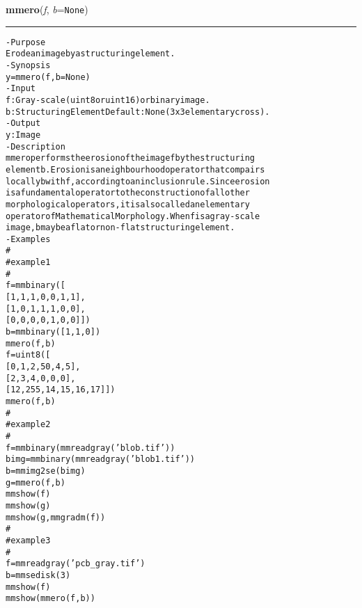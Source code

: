     \label{multireg:num_pymorph:mmero}
    \vspace{0.5ex}

    \begin{boxedminipage}{\textwidth}

    \raggedright \textbf{mmero}(\textit{f}, \textit{b}=\texttt{N\-o\-n\-e\-})

    \vspace{-1.5ex}

    \rule{\textwidth}{0.5\fboxrule}
\begin{alltt}
- Purpose
    Erode an image by a structuring element.
- Synopsis
    y = mmero(f, b=None)
- Input
    f: Gray-scale (uint8 or uint16) or binary image.
    b: Structuring Element Default: None (3x3 elementary cross).
- Output
    y: Image
- Description
    mmero performs the erosion of the image f by the structuring
    element b . Erosion is a neighbourhood operator that compairs
    locally b with f , according to an inclusion rule. Since erosion
    is a fundamental operator to the construction of all other
    morphological operators, it is also called an elementary
    operator of Mathematical Morphology. When f is a gray-scale
    image , b may be a flat or non-flat structuring element.
- Examples
    \#
    \#   example 1
    \#
    f=mmbinary([
       [1, 1, 1, 0, 0, 1, 1],
       [1, 0, 1, 1, 1, 0, 0],
       [0, 0, 0, 0, 1, 0, 0]])
    b=mmbinary([1, 1, 0])
    mmero(f,b)
    f=uint8([
       [ 0,   1,  2, 50,  4,  5],
       [ 2,   3,  4,  0,  0,  0],
       [12, 255, 14, 15, 16, 17]])
    mmero(f,b)
    \#
    \#   example 2
    \#
    f=mmbinary(mmreadgray('blob.tif'))
    bimg=mmbinary(mmreadgray('blob1.tif'))
    b=mmimg2se(bimg)
    g=mmero(f,b)
    mmshow(f)
    mmshow(g)
    mmshow(g,mmgradm(f))
    \#
    \#   example 3
    \#
    f=mmreadgray('pcb\_gray.tif')
    b=mmsedisk(3)
    mmshow(f)
    mmshow(mmero(f,b))\end{alltt}

    \vspace{1ex}

    \end{boxedminipage}

    \label{multireg:num_pymorph:mmero_old}
    \vspace{0.5ex}

